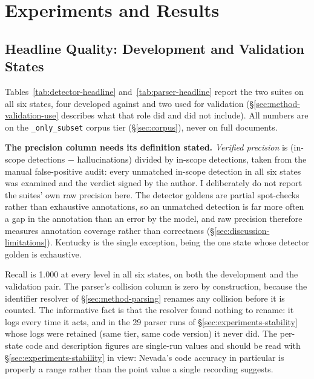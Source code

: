 \section{Experiments and Results}
\label{sec:experiments-results}

\subsection{Headline Quality: Development and Validation States}
\label{sec:experiments-headline}

Tables~\ref{tab:detector-headline} and~\ref{tab:parser-headline} report the two
suites on all six states, four developed against and two used for validation
(\S\ref{sec:method-validation-use} describes what that role did and did not
include). All
numbers are on the \texttt{\_only\_subset} corpus tier (\S\ref{sec:corpus}),
never on full documents.





\textbf{The precision column needs its definition stated.}
\emph{Verified precision} is (in-scope detections $-$ hallucinations) divided by
in-scope detections, taken from the manual false-positive audit: every unmatched
in-scope detection in all six states was examined and the verdict signed by the
author. I deliberately do not report the suites' own raw precision here. The
detector goldens are partial spot-checks rather than exhaustive annotations, so
an unmatched detection is far more often a gap in the annotation than an error
by the model, and raw precision therefore measures annotation coverage rather
than correctness (\S\ref{sec:discussion-limitations}). Kentucky is the single
exception, being the one state whose detector golden is exhaustive.

Recall is 1.000 at every level in all six states, on both the development and
the validation pair. The parser's collision column is zero by construction,
because the identifier resolver of \S\ref{sec:method-parsing} renames any
collision before it is counted. The informative fact is that the resolver
found nothing to rename: it logs every time it acts, and in the 29 parser runs
of \S\ref{sec:experiments-stability} whose logs were retained (same tier, same
code version) it never did.
The per-state code and description figures are single-run values and should be
read with \S\ref{sec:experiments-stability} in view: Nevada's code accuracy in
particular is properly a range rather than the point value a single recording
suggests.

